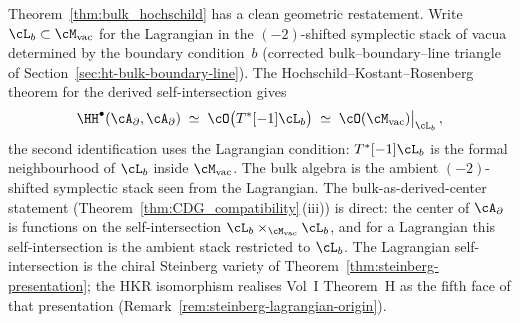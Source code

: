 \begin{remark}
\label{rem:lagrangian-self-intersection}
Theorem~\ref{thm:bulk_hochschild} has a clean geometric
restatement. Write $\cL_b \subset \cM_{\mathrm{vac}}$ for the
Lagrangian in the $(-2)$-shifted symplectic stack of vacua
determined by the boundary condition~$b$
(corrected bulk--boundary--line triangle of
Section~\ref{sec:ht-bulk-boundary-line}).
The Hochschild--Kostant--Rosenberg theorem for the derived
self-intersection gives
\[
 \HH^\bullet(\cA_\partial,\cA_\partial)
 \;\simeq\;
 \cO\bigl(T^*[-1]\cL_b\bigr)
 \;\simeq\;
 \cO(\cM_{\mathrm{vac}})\big|_{\cL_b}\,,
\]
the second identification uses the Lagrangian condition:
$T^*[-1]\cL_b$ is the formal neighbourhood of $\cL_b$ inside
$\cM_{\mathrm{vac}}$. The bulk algebra is the
ambient $(-2)$-shifted symplectic stack seen from the
Lagrangian. The bulk-as-derived-center statement
(Theorem~\ref{thm:CDG_compatibility}\,(iii)) is direct: the center of $\cA_\partial$ is functions
on the self-intersection $\cL_b \times_{\cM_{\mathrm{vac}}}
\cL_b$, and for a Lagrangian this self-intersection is
the ambient stack restricted to $\cL_b$. The Lagrangian
self-intersection is the chiral Steinberg variety of
Theorem~\ref{thm:steinberg-presentation}; the HKR isomorphism
realises Vol~I Theorem~H as the fifth face of that
presentation (Remark~\ref{rem:steinberg-lagrangian-origin}).
\end{remark}

